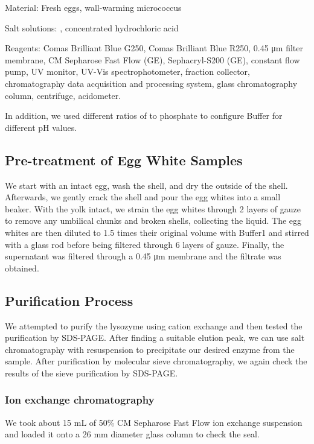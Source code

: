 Material: Fresh eggs, wall-warming micrococcus

Salt solutions: , concentrated hydrochloric acid

Reagents: Comas Brilliant Blue G250, Comas Brilliant Blue R250, 0.45 μm filter
membrane, CM Sepharose Fast Flow (GE), Sephacryl-S200 (GE), constant
flow pump, UV monitor, UV-Vis spectrophotometer, fraction collector,
chromatography data acquisition and processing system, glass
chromatography column, centrifuge, acidometer.


In addition, we used different ratios of  to phosphate to configure Buffer for different pH values.


\subsection{Pre-treatment of Egg White
		Samples}

We start with an intact egg, wash the shell, and dry the outside of the
shell. Afterwards, we gently crack the shell and pour the egg whites
into a small beaker. With the yolk intact, we strain the egg whites
through 2 layers of gauze to remove any umbilical chunks and broken
shells, collecting the liquid. The egg whites are then diluted to 1.5
times their original volume with Buffer1 and stirred with a glass rod
before being filtered through 6 layers of gauze. Finally, the
supernatant was filtered through a 0.45 μm membrane and the filtrate was
obtained.

\hypertarget{purification-process}{%
	\subsection{Purification Process}\label{purification-process}}

We attempted to purify the lysozyme using cation exchange and then
tested the purification by SDS-PAGE. After finding a suitable elution
peak, we can use salt chromatography with resuspension to precipitate
our desired enzyme from the sample. After purification by molecular
sieve chromatography, we again check the results of the sieve
purification by SDS-PAGE.

\subsubsection{Ion exchange chromatography}

We took about 15 mL of 50\% CM Sepharose Fast Flow ion exchange
suspension and loaded it onto a 26 mm diameter glass column to check the
seal.

